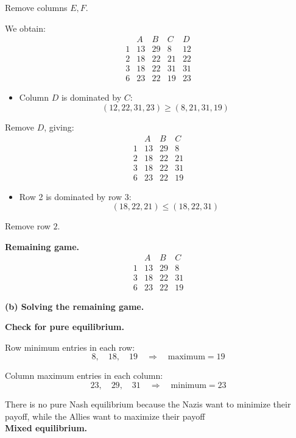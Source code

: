 Remove columns \(E,F\).

We obtain:
\[
\begin{array}{c|cccc}
 & A & B & C & D\\
\hline
1 & 13 & 29 & 8 & 12\\
2 & 18 & 22 & 21 & 22\\
3 & 18 & 22 & 31 & 31\\
6 & 23 & 22 & 19 & 23
\end{array}
\]

\begin{itemize}
\item Column \(D\) is dominated by \(C\):
\[
(12,22,31,23)\ge (8,21,31,19)
\]
\end{itemize}

Remove \(D\), giving:
\[
\begin{array}{c|ccc}
 & A & B & C\\
\hline
1 & 13 & 29 & 8\\
2 & 18 & 22 & 21\\
3 & 18 & 22 & 31\\
6 & 23 & 22 & 19
\end{array}
\]

\begin{itemize}
\item Row 2 is dominated by row 3:
\[
(18,22,21)\le (18,22,31)
\]
\end{itemize}

Remove row \(2\).

\textbf{Remaining game.}
\[
\boxed{
\begin{array}{c|ccc}
 & A & B & C\\
\hline
1 & 13 & 29 & 8\\
3 & 18 & 22 & 31\\
6 & 23 & 22 & 19
\end{array}}
\]

\textbf{(b) Solving the remaining game.}

\textbf{Check for pure equilibrium.}

Row minimum entries in each row:
\[
8,\quad 18,\quad 19 \quad \Rightarrow \quad \text{maximum}=19
\]

Column maximum entries in each column:
\[
23,\quad 29,\quad 31 \quad \Rightarrow \quad \text{minimum}=23
\]

There is no pure Nash equilibrium because the Nazis want to minimize their payoff, while the Allies want to maximize their payoff\\

\textbf{Mixed equilibrium.}


